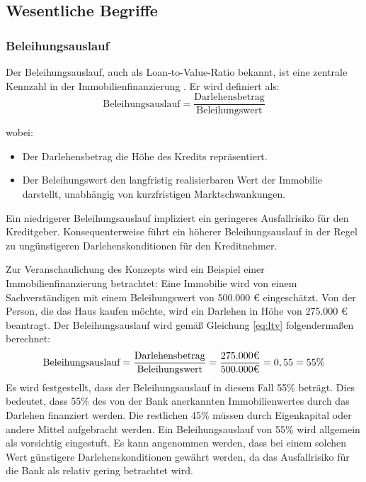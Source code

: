 
\subsection{Wesentliche Begriffe}
\subsubsection{Beleihungsauslauf}
Der Beleihungsauslauf, auch als Loan-to-Value-Ratio bekannt, ist eine zentrale Kennzahl in der Immobilienfinanzierung \parencite{BelWertV_3}. Er wird definiert als:
\begin{equation}
    \text{Beleihungsauslauf} = \frac{\text{Darlehensbetrag}}{\text{Beleihungswert}}
    \label{eq:ltv}
\end{equation}

\noindent wobei:
\begin{itemize}
    \item Der Darlehensbetrag die Höhe des Kredits repräsentiert.
    \item Der Beleihungswert den langfristig realisierbaren Wert der Immobilie darstellt, unabhängig von kurzfristigen Marktschwankungen.
\end{itemize}

Ein niedrigerer Beleihungsauslauf impliziert ein geringeres Ausfallrisiko für den Kreditgeber. Konsequenterweise führt ein höherer Beleihungsauslauf in der Regel zu ungünstigeren Darlehenskonditionen für den Kreditnehmer.

Zur Veranschaulichung des Konzepts wird ein Beispiel einer Immobilienfinanzierung betrachtet:
Eine Immobilie wird von einem Sachverständigen mit einem Beleihungswert von 500.000 € eingeschätzt. Von der Person, die das Haus kaufen möchte, wird ein Darlehen in Höhe von 275.000 € beantragt.
Der Beleihungsauslauf wird gemäß Gleichung \ref{eq:ltv} folgendermaßen berechnet:
\begin{equation}
    \text{Beleihungsauslauf} = \frac{\text{Darlehensbetrag}}{\text{Beleihungswert}} = \frac{275.000 \mbox{\texteuro}}{500.000 \mbox{\texteuro}} = 0,55 = 55\%
\end{equation}
Es wird festgestellt, dass der Beleihungsauslauf in diesem Fall 55\% beträgt. Dies bedeutet, dass 55\% des von der Bank anerkannten Immobilienwertes durch das Darlehen finanziert werden. Die restlichen 45\% müssen durch Eigenkapital oder andere Mittel aufgebracht werden.
Ein Beleihungsauslauf von 55\% wird allgemein als vorsichtig eingestuft. Es kann angenommen werden, dass bei einem solchen Wert günstigere Darlehenskonditionen gewährt werden, da das Ausfallrisiko für die Bank als relativ gering betrachtet wird.
